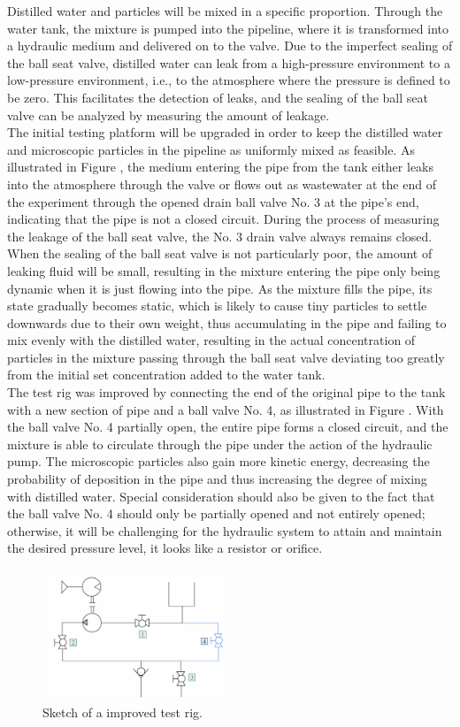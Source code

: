 Distilled water and particles will be mixed in a specific proportion. 
Through the water tank, the mixture is pumped into the pipeline, where 
it is transformed into a hydraulic medium and delivered on to the valve. 
Due to the imperfect sealing of the ball seat valve, distilled water can leak 
from a high-pressure environment to a low-pressure environment, i.e., to the 
atmosphere where the pressure is defined to be zero. This facilitates the detection of leaks, 
and the sealing of the ball seat valve can be analyzed by measuring the amount of leakage.\\

The initial testing platform will be upgraded in order to keep the distilled water and microscopic
 particles in the pipeline as uniformly mixed as feasible. As illustrated in Figure , 
 the medium 
 entering the pipe from the tank either leaks into the atmosphere through the valve or flows out as 
 wastewater at the end of the experiment through the opened drain ball valve No. 3 at the pipe's end, 
 indicating that the pipe is not a closed circuit. During the process of measuring the leakage of the 
 ball seat valve, the No. 3 drain valve always remains closed. When the sealing of the ball seat valve 
 is not particularly poor, the amount of leaking fluid will be small, resulting in the mixture entering 
 the pipe only being dynamic when it is just flowing into the pipe. As the mixture fills the pipe, its 
 state gradually becomes static, which is likely to cause tiny particles to settle downwards due to their
  own weight, thus accumulating in the pipe and failing to mix evenly with the distilled water, resulting 
  in the actual concentration of particles in the mixture passing through the ball seat valve 
 deviating too greatly from the initial set concentration added to the water tank.\\

 The test rig was improved by connecting the end of the original pipe to the tank with a new section of
  pipe and a ball valve No. 4, as illustrated in Figure . With the ball valve No. 4 partially open, 
  the entire pipe forms a closed circuit, and the mixture is able to circulate through the pipe under 
  the action of the hydraulic pump. The microscopic particles also gain more kinetic energy, decreasing 
  the probability of deposition in the pipe and thus increasing the degree of mixing with distilled water. 
  Special consideration should also be given to the fact that the ball valve No. 4 should only be partially 
  opened and not entirely opened; otherwise, it will be challenging for the hydraulic system 
  to attain and maintain the desired pressure level, it looks like a resistor or orifice.

  \begin{figure}[htbp]
    \centering
    \includegraphics[width=0.5\textwidth]{figures/TestRig/TestRig2.jpg}
    \caption{Sketch of a improved test rig.}
    \label{fig:TestRig2}
\end{figure}